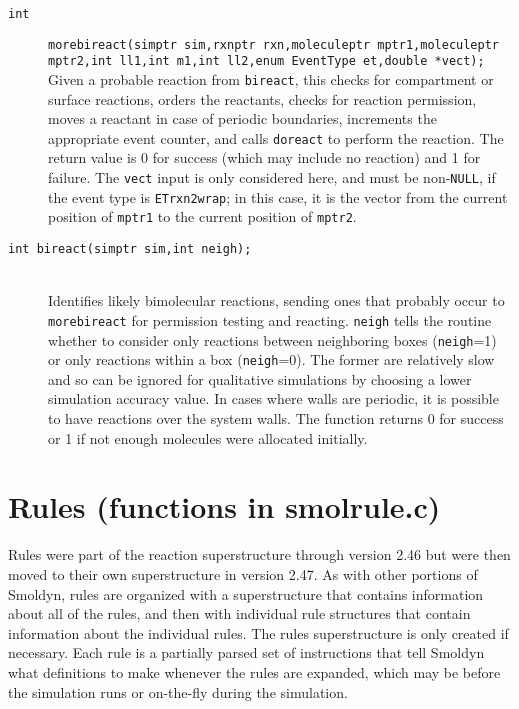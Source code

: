 \documentclass {book}
\begin{document}
\begin{description}
\item[\texttt{int}]
\texttt{morebireact(simptr sim,rxnptr rxn,moleculeptr mptr1,moleculeptr mptr2,int ll1,int m1,int ll2,enum EventType et,double *vect);} \\
Given a probable reaction from \texttt{bireact}, this checks for compartment or surface reactions, orders the reactants, checks for reaction permission, moves a reactant in case of periodic boundaries, increments the appropriate event counter, and calls \texttt{doreact} to perform the reaction. The return value is 0 for success (which may include no reaction) and 1 for failure. The \texttt{vect} input is only considered here, and must be non-\texttt{NULL}, if the event type is \texttt{ETrxn2wrap}; in this case, it is the vector from the current position of \texttt{mptr1} to the current position of \texttt{mptr2}.

\item[\texttt{int bireact(simptr sim,int neigh);}]
\hfill \\
Identifies likely bimolecular reactions, sending ones that probably occur to \texttt{morebireact} for permission testing and reacting. \texttt{neigh} tells the routine whether to consider only reactions between neighboring boxes (\texttt{neigh}=1) or only reactions within a box (\texttt{neigh}=0). The former are relatively slow and so can be ignored for qualitative simulations by choosing a lower simulation accuracy value. In cases where walls are periodic, it is possible to have reactions over the system walls. The function returns 0 for success or 1 if not enough molecules were allocated initially.

\end{description}

\section{Rules (functions in smolrule.c)}

Rules were part of the reaction superstructure through version 2.46 but were then moved to their own superstructure in version 2.47. As with other portions of Smoldyn, rules are organized with a superstructure that contains information about all of the rules, and then with individual rule structures that contain information about the individual rules. The rules superstructure is only created if necessary. Each rule is a partially parsed set of instructions that tell Smoldyn what definitions to make whenever the rules are expanded, which may be before the simulation runs or on-the-fly during the simulation.
\end{document}
